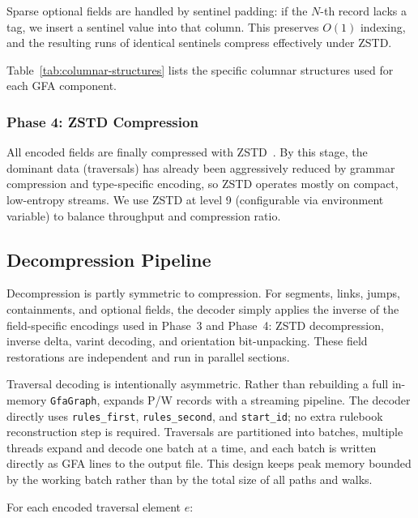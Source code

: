 Sparse optional fields are handled by sentinel padding: if the $N$-th record lacks a tag, we insert a sentinel value into that column. This preserves $O(1)$ indexing, and the resulting runs of identical sentinels compress effectively under ZSTD.

Table~\ref{tab:columnar-structures} lists the specific columnar structures used for each GFA component.




\subsubsection{Phase 4: ZSTD Compression}

All encoded fields are finally compressed with ZSTD~\cite{collet2021rfc}. By this stage, the dominant data (traversals) has already been aggressively reduced by grammar compression and type-specific encoding, so ZSTD operates mostly on compact, low-entropy streams. We use ZSTD at level 9 (configurable via environment variable) to balance throughput and compression ratio.





\subsection{Decompression Pipeline}\label{subsec:decompression}

Decompression is partly symmetric to compression. For segments, links, jumps, containments, and optional fields, the decoder simply applies the inverse of the field-specific encodings used in Phase~3 and Phase~4: ZSTD decompression, inverse delta, varint decoding, and orientation bit-unpacking. These field restorations are independent and run in parallel sections.

Traversal decoding is intentionally asymmetric. Rather than rebuilding a full in-memory \texttt{GfaGraph}, \gfaz expands P/W records with a streaming pipeline. The decoder directly uses \texttt{rules\_first}, \texttt{rules\_second}, and \texttt{start\_id}; no extra rulebook reconstruction step is required. Traversals are partitioned into batches, multiple threads expand and decode one batch at a time, and each batch is written directly as GFA lines to the output file. This design keeps peak memory bounded by the working batch rather than by the total size of all paths and walks.

For each encoded traversal element $e$:

